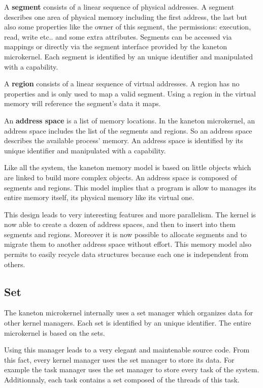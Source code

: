 \begin{multicols}{2}
A \textbf{segment} consists of a linear sequence of physical addresses.
A segment describes one area of physical memory including the
first address, the last but also some properties like the owner of this
segment, the permissions: execution, read, write etc.. and some
extra attributes. Segments can be accessed via mappings or directly via
the segment interface provided by the kaneton microkernel. Each segment
is identified by an unique identifier and manipulated with a capability.

A \textbf{region} consists of a linear sequence of virtual addresses.
A region has no properties and is only used to map a valid segment.
Using a region in the virtual memory will reference the segment's data
it maps.

An \textbf{address space} is a list of memory locations. In the kaneton
microkernel, an address space includes the list of the segments and regions.
So an address space describes the available process' memory. An address space
is identified by its unique identifier and manipulated with a capability.

Like all the system, the kaneton memory model is based on little objects which
are linked to build more complex objects. An address space is composed
of segments and regions. This model implies that a program is allow to
manages its entire memory itself, its physical memory like its virtual one.

This design leads to very interesting features and more parallelism.
The kernel is now able to create a dozen of address spaces, and then to
insert into them segments and regions. Moreover it is now possible to allocate
segments and to migrate them to another address space without effort. This
memory model also permits to easily recycle data structures because each one
is independent from others.

\subsection{Set}

The kaneton microkernel internally uses a set manager which organizes data
for other kernel managers. Each set is identified by an unique identifier.
The entire microkernel is based on the sets.

Using this manager leads to a very elegant and maintenable source code. From
this fact, every kernel manager uses the set manager to store its data. For
example the task manager uses the set manager to store every task of the
system. Additionnaly, each task contains a set composed of the threads of
this task.


\end{multicols}
